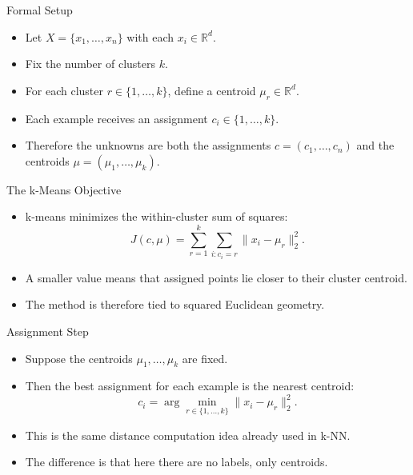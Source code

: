 \begin{frame}{Formal Setup}
\begin{itemize}
  \item Let $X=\{x_1,\dots,x_n\}$ with each $x_i \in \mathbb{R}^d$.
  \pause
  \item Fix the number of clusters $k$.
  \pause
  \item For each cluster $r \in \{1,\dots,k\}$, define a centroid $\mu_r \in \mathbb{R}^d$.
  \pause
  \item Each example receives an assignment $c_i \in \{1,\dots,k\}$.
  \pause
  \item Therefore the unknowns are both the assignments $c=(c_1,\dots,c_n)$ and the centroids $\mu=(\mu_1,\dots,\mu_k)$.
\end{itemize}
\end{frame}

\begin{frame}{The k-Means Objective}
\begin{itemize}
  \item k-means minimizes the within-cluster sum of squares:
  \begin{equation}
    J(c,\mu)
    =
    \sum_{r=1}^{k}\sum_{i:c_i=r}\|x_i-\mu_r\|_2^2.
    \label{eq:kmeans-objective}
  \end{equation}
  \pause
  \item A smaller value means that assigned points lie closer to their cluster centroid.
  \pause
  \item The method is therefore tied to squared Euclidean geometry.
\end{itemize}
\end{frame}

\begin{frame}{Assignment Step}
\begin{itemize}
  \item Suppose the centroids $\mu_1,\dots,\mu_k$ are fixed.
  \pause
  \item Then the best assignment for each example is the nearest centroid:
  \begin{equation}
    c_i
    =
    \arg\min_{r \in \{1,\dots,k\}}
    \|x_i-\mu_r\|_2^2.
    \label{eq:kmeans-assignment}
  \end{equation}
  \pause
  \item This is the same distance computation idea already used in k-NN.
  \pause
  \item The difference is that here there are no labels, only centroids.
\end{itemize}
\end{frame}

